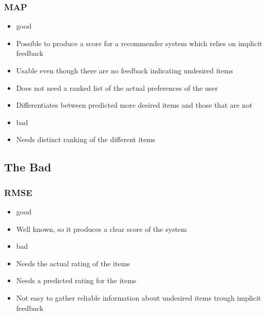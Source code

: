 \subsubsection{MAP}
\begin{itemize}
	\item good
	\item Possible to produce a score for a recommender system which relies on implicit feedback
	\item Usable even though there are no feedback indicating undesired items
	\item Does not need a ranked list of the actual preferences of the user
	\item Differentiates between predicted more desired items and those that are not
	\item bad
	\item Needs distinct ranking of the different items
\end{itemize}


\subsection{The Bad}
\subsubsection{RMSE}
\begin{itemize}
	\item good
	\item Well known, so it produces a clear score of the system
	\item bad
	\item Needs the actual rating of the items
	\item Needs a predicted rating for the items
	\item Not easy to gather reliable information about undesired items trough implicit feedback
\end{itemize}

